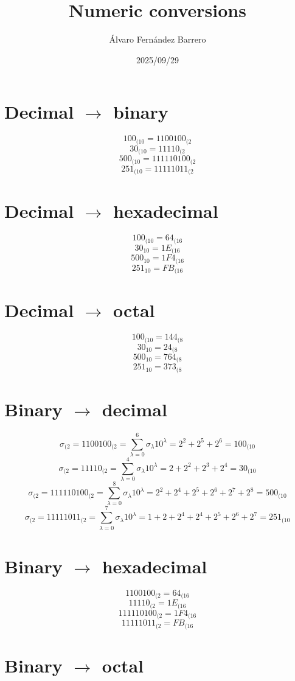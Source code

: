 \documentclass[12pt]{article}
\title{Numeric conversions}
\author{Álvaro Fernández Barrero}
\date{2025/09/29}
\begin{document}
\maketitle

\section{Decimal \(\to\) binary}

\[
	100_{(10} = 1100100_{(2}
\]
\[
	30_{(10} = 11110_{(2}
\]
\[
	500_{(10} = 111110100_{(2}
\]
\[
	251_{(10} = 11111011_{(2}
\]

\section{Decimal \(\to\) hexadecimal}

\[
	100_{(10} = 64_{(16}
\]
\[
	30_{10} = 1E_{(16}
\]
\[
	500_{10} = 1F4_{(16}
\]
\[
	251_{10} = FB_{(16}
\]

\section{Decimal \(\to\) octal}

\[
	100_{(10} = 144_{(8}
\]
\[
	30_{10} = 24_{(8}
\]
\[
	500_{10} = 764_{(8}
\]
\[
	251_{10} = 373_{(8}
\]

\section{Binary \(\to\) decimal}

\[
	\sigma_{(2} = 1100100_{(2} = \sum_{\lambda=0}^{6}\sigma_{\lambda}10^{\lambda} = 2^2 + 2^5 + 2^6 = 100_{(10}
\]
\[
	\sigma_{(2} = 11110_{(2} = \sum_{\lambda=0}^{4}\sigma_{\lambda}10^{\lambda} = 2 + 2^2 + 2^3 + 2^4 = 30_{(10}
\]
\[
	\sigma_{(2} = 111110100_{(2} = \sum_{\lambda=0}^{8}\sigma_{\lambda}10^{\lambda} = 2^2 + 2^4 + 2^5 + 2^6 + 2^7 + 2^8 = 500_{(10}
\]
\[
	\sigma_{(2} = 11111011_{(2} = \sum_{\lambda=0}^{7}\sigma_{\lambda}10^{\lambda} = 1 + 2 + 2^4 + 2^4 + 2^5 + 2^6 + 2^7 = 251_{(10}
\]

\section{Binary \(\to\) hexadecimal}

\[
	1100100_{(2} = 64_{(16}
\]
\[
	11110_{(2} = 1E_{(16}
\]
\[
	111110100_{(2} = 1F4_{(16}
\]
\[
	11111011_{(2} = FB_{(16}
\]

\section{Binary \(\to\) octal}
\end{document}
